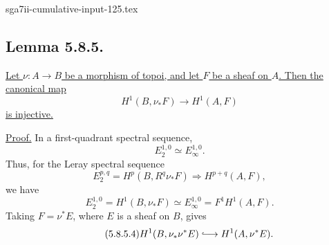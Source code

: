 \begin{filecontents*}{sga7ii-cumulative-input-125.tex}
\subsection*{Lemma 5.8.5.}
\underline{Let $\nu:A\to B$ be a morphism of topoi, and let $F$ be a
sheaf on $A$.  Then the canonical map}
\begin{equation}\tag{5.8.5.1}
H^1(B,\nu_*F)\longrightarrow H^1(A,F)
\end{equation}
\underline{is injective.}

\underline{Proof.}
In a first-quadrant spectral sequence,
\begin{equation}\tag{5.8.5.2}
E_2^{1,0}\simeq E_\infty^{1,0}.
\end{equation}
Thus, for the Leray spectral sequence
\[
E_2^{p,q}=H^p(B,R^q\nu_*F)
\Longrightarrow H^{p+q}(A,F),
\]
we have
\begin{equation}\tag{5.8.5.3}
E_2^{1,0}=H^1(B,\nu_*F)
\simeq E_\infty^{1,0}
=F^1H^1(A,F).
\end{equation}
Taking $F=\nu^*E$, where $E$ is a sheaf on $B$, gives
\begin{equation}\tag{5.8.5.4}
H^1(B,\nu_*\nu^*E)
\lhook\joinrel\longrightarrow
H^1(A,\nu^*E).
\end{equation}
\end{filecontents*}
